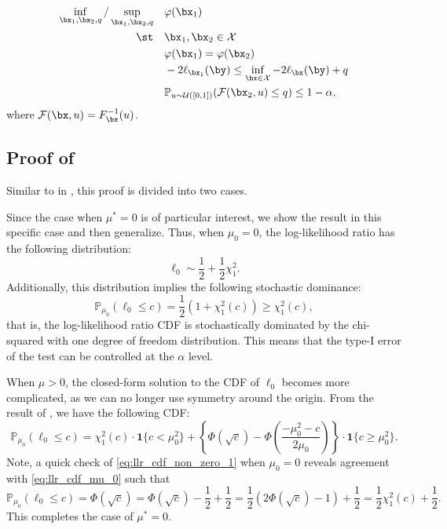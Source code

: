 \documentclass[11pt]{article}
\numberwithin{equation}{section}
\numberwithin{figure}{section}
\begin{document}
\begin{equation}\label{eq:ccojoint}
\begin{aligned}
\inf_{\bx_1, \bx_2, q}/\sup_{\bx_1, \bx_2, q} \quad & \varphi(\bx_1) \\
\st \quad & \bx_1, \bx_2 \in \mathcal X\\
& \varphi(\bx_1) = \varphi(\bx_2) \\ 
& -2\ell_{\bx_1}(\by) \leq \inf_{\bx \in \mathcal X} -2\ell_{\bx}(\by) + q \\ 
& \mathbb{P}_{u \sim \mathcal{U}([0,1])}( \mathcal{F}(\bx_2, u) \leq q) \leq 1-\alpha,
\end{aligned}
\end{equation}
where $\mathcal{F}(\bx, u) = F^{-1}_\bx(u)$.

\subsection{Proof of }  \label{app:constrained_1d_gaussian}

Similar to  in , this proof is divided into two cases.

Since the case when $\mu^* = 0$ is of particular interest, we show the result in this specific case and then generalize. 
Thus, when $\mu_0 = 0$, the log-likelihood ratio has the following distribution:
\begin{equation}
    \ell_0 \sim \frac{1}{2} + \frac{1}{2} \chi^2_1.
\end{equation}
Additionally, this distribution implies the following stochastic dominance:
\begin{equation} \label{eq:llr_cdf_mu_0}
    \mathbb{P}_{\mu_0} \left(\ell_0 \leq c \right) = \frac{1}{2} \left( 1 + \chi^2_1(c) \right) \geq \chi^2_1(c),
\end{equation}
that is, the log-likelihood ratio CDF is stochastically dominated by the chi-squared with one degree of freedom distribution. This means that the type-I error of the test can be controlled at the $\alpha$ level.

When $\mu > 0$, the closed-form solution to the CDF of $\ell_0$ becomes more complicated, as we can no longer use symmetry around the origin. 
From the result of ,
we have the following CDF:
\begin{equation} 
    \label{eq:llr_cdf_non_zero_1}
    \mathbb{P}_{\mu_0} \left( \ell_0 \leq c \right) = \chi^2_1(c) \cdot \bm{1} \{ c < \mu_0^2 \} + \left\{ \Phi(\sqrt{c}) - \Phi\left( \frac{-\mu_0^2 - c}{2 \mu_0} \right) \right\} \cdot \bm{1} \{ c \geq \mu_0^2 \}.
\end{equation}
Note, a quick check of \eqref{eq:llr_cdf_non_zero_1} when $\mu_0 = 0$ reveals agreement with \eqref{eq:llr_cdf_mu_0} such that
\begin{equation}
    \mathbb{P}_{\mu_0} \left(\ell_0 \leq c \right) = \Phi(\sqrt{c}) = \Phi(\sqrt{c}) - \frac{1}{2} + \frac{1}{2} = \frac{1}{2}\left(2 \Phi(\sqrt{c}) - 1 \right) + \frac{1}{2} = \frac{1}{2} \chi^2_1(c) + \frac{1}{2}.
\end{equation}
This completes the case of $\mu^* = 0$.
\end{document}
